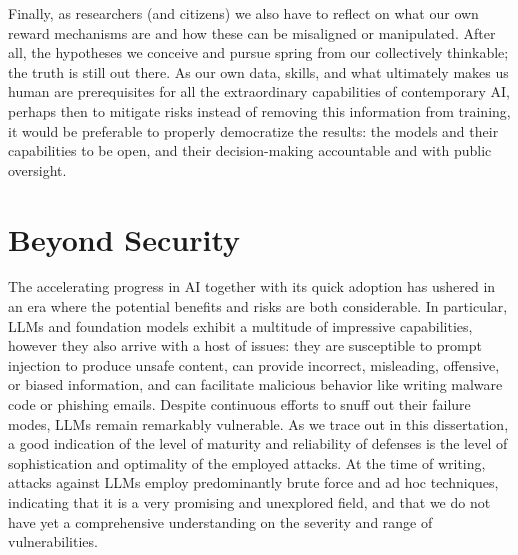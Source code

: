 Finally, as researchers (and citizens) we also have to reflect on what our own reward mechanisms are and how these can be misaligned or manipulated.
After all, the hypotheses we conceive and pursue spring from our collectively thinkable; the truth is still out there.
As our own data, skills, and what ultimately makes us human are prerequisites for all the extraordinary capabilities of contemporary \gls{AI}, perhaps then to mitigate risks instead of removing this information from training, it would be preferable to properly democratize the results: the models and their capabilities to be open, and their decision-making accountable and with public oversight.

\section{Beyond Security}

The accelerating progress in \gls{AI} together with its quick adoption has ushered in an era where the potential benefits and risks are both considerable.
In particular, LLMs and foundation models exhibit a multitude of impressive capabilities, however they also arrive with a host of issues: they are susceptible to prompt injection to produce unsafe content, can provide incorrect, misleading, offensive, or biased information, and can facilitate malicious behavior like writing malware code or phishing emails.
Despite continuous efforts to snuff out their failure modes, LLMs remain remarkably vulnerable.
As we trace out in this dissertation, a good indication of the level of maturity and reliability of defenses is the level of sophistication and optimality of the employed attacks.
At the time of writing, attacks against LLMs employ predominantly brute force and ad hoc techniques, indicating that it is a very promising and unexplored field, and that we do not have yet a comprehensive understanding on the severity and range of vulnerabilities.

